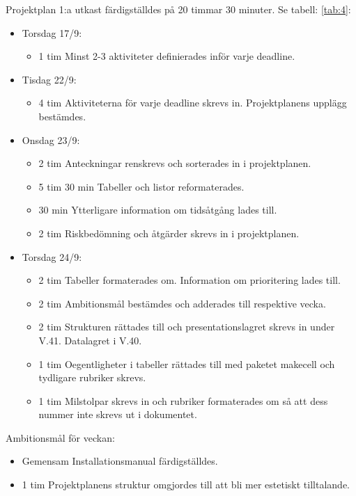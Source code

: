 \documentclass{TDP003mall}
\begin{document}
  Projektplan 1:a utkast färdigställdes på 20 timmar 30 minuter. Se tabell: \ref{tab:4}:
\begin{itemize}
  \item Torsdag 17/9:
  \begin{itemize}
    \item 1 tim Minst 2-3 aktiviteter definierades inför varje deadline.
  \end{itemize}
  \item Tisdag 22/9:
  \begin{itemize}
    \item 4 tim Aktiviteterna för varje deadline skrevs in. Projektplanens upplägg bestämdes.
  \end{itemize}
  \item Onsdag 23/9:
  \begin{itemize}
    \item 2 tim Anteckningar renskrevs och sorterades in i projektplanen.
    \item 5 tim 30 min Tabeller och listor reformaterades.
    \item 30 min Ytterligare information om tidsåtgång lades till.
    \item 2 tim Riskbedömning och åtgärder skrevs in i projektplanen.
  \end{itemize}
  \item Torsdag 24/9:
  \begin{itemize}
    \item 2 tim Tabeller formaterades om. Information om prioritering lades till.
    \item 2 tim Ambitionsmål bestämdes och adderades till respektive vecka.
     \item 2 tim Strukturen rättades till och presentationslagret skrevs in under V.41. Datalagret i V.40.
    \item 1 tim Oegentligheter i tabeller rättades till med paketet makecell och tydligare rubriker skrevs.
    \item 1 tim Milstolpar skrevs in och rubriker formaterades om så att dess nummer inte skrevs ut i dokumentet.
  \end{itemize}
\end{itemize}

Ambitionsmål för veckan:
\begin{itemize}
\item Gemensam Installationsmanual färdigställdes.
  \item 1 tim Projektplanens struktur omgjordes till att bli mer estetiskt tilltalande.
  \end{itemize}
\end{document}
